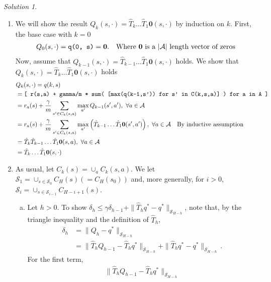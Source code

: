 \documentclass{article}
\newcommand{\norm}[1]{\| #1 \|}
\DeclareMathOperator*{\1}{\mathbbm{1}}
\newcommand{\0}{\mathbf{0}}
\theoremstyle{definition}
\theoremstyle{remark}
\newtheorem*{solution*}{Solution}
\newcommand{\cS}{\mathcal{S}}
\newcommand{\cA}{\mathcal{A}}
\begin{document}
\begin{solution*}
\mbox{}

\begin{enumerate}
\item We will show the result $Q_k(s,\cdot) = \hat T_k \dots \hat T_1 \0 (s,\cdot)$ by induction on $k$.
First, the base case with $k=0$
\begin{align*}
  & Q_0(s, \cdot) = \text{{\tt q(0, s)}} = \0. & \text{Where $\0$ is a $|\cA|$ length vector of zeros} \\
\end{align*}
Now, assume that $Q_{k-1}(s,\cdot) = \hat T_{k-1} \dots \hat T_1 \0 (s,\cdot)$ holds. We show that $Q_{k}(s,\cdot) = \hat T_{k} \dots \hat T_1 \0 (s,\cdot)$ holds
\begin{align*}
  & Q_{k}(s, \cdot) = q(k, s) \\
  &= \text{\tt [ r(s,a) + gamma/m * sum( [max(q(k-1,s')) for s' in C(k,s,a)] ) for a in A ]} \\
  &= r_a(s) + \frac{\gamma}{m} \sum_{s' \in C_{k}(s,a)} \max_{a'} Q_{k-1}(s', a'), \ \forall a \in \cA \\
  &= r_a(s) + \frac{\gamma}{m} \sum_{s' \in C_{k}(s,a)} \max_{a'} \left( \hat T_{k-1} \dots \hat T_1 \0 (s', a') \right), \ \forall a \in \cA \quad \text{By inductive assumption} \\
  &= \hat T_k \hat T_{k-1} \dots \hat T_1 \0 (s, a), \ \forall a \in \cA \\
  &= \hat T_k \dots \hat T_1 \0 (s, \cdot)
\end{align*}
\item As usual, let $C_k(s) = \cup_a C_k(s,a)$.
We let $\cS_1 = \cup_{s\in \cS_0} C_H(s) (=C_H(s_0))$ and, more generally,
for $i>0$, 
 $\cS_i  = \cup_{s\in \cS_{i-1}} C_{H-i+1}(s)$.
\begin{enumerate}[(a)]
\item Let $h>0$. 
To show 
$\delta_h \le \gamma \delta_{h-1} + \norm{ \hat T_h q^* - q^* }_{\cS_{H-h}}$,
 note that, by the triangle inequality and the definition of $\hat T_h$,
 \begin{align*}
\delta_h 
& = \norm{Q_h-q^*}_{\cS_{H-h}}\\
& = \norm{ \hat T_h Q_{h-1}  - \hat T_h q^*}_{\cS_{H-h}} + 
       \norm{ \hat T_h q^* - q^*}_{\cS_{H-h}}\,.
\end{align*}
For the first term,
\begin{align*}
\norm{ \hat T_h  Q_{h-1} - \hat T_h q^*}_{\cS_{H-h}}

\end{align*}
\end{enumerate}
\end{enumerate}
\end{solution*}
\end{document}
